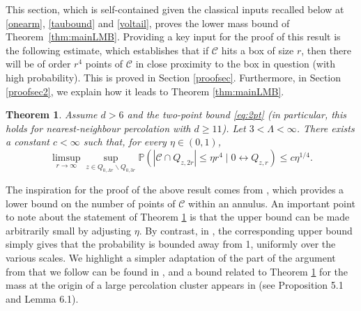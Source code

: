 \documentclass[11pt]{article}
\theoremstyle{definition}
\theoremstyle{remark}
\newcommand{\bP}{\mathbb{P}}
\numberwithin{equation}{section}
\theoremstyle{plain}
\newtheorem{thm}[theorem]{Theorem}
\theoremstyle{definition}
\theoremstyle{remark}
\theoremstyle{plain}
\begin{document}
This section, which is self-contained given the classical inputs recalled below at \eqref{onearm}, \eqref{taubound} and \eqref{voltail}, proves the lower mass bound of Theorem~\ref{thm:mainLMB}. Providing a key input for the proof of this result is the following estimate, which establishes that if $\mathcal{C}$ hits a box of size $r$, then there will be of order $r^4$ points of $\mathcal{C}$ in close proximity to the box in question (with high probability). This is proved in Section \ref{proofsec}. Furthermore, in Section \ref{proofsec2}, we explain how it leads to Theorem \ref{thm:mainLMB}.

\begin{thm}\label{thm:ulmb} Assume $d>6$ and the two-point bound \eqref{eq:2pt} (in particular, this holds for nearest-neighbour percolation with $d\ge11$). Let $3< \Lambda <\infty$. There exists a constant $c<\infty$ such that, for every $\eta\in(0,1)$,
\[\limsup_{r \rightarrow \infty}\sup_{z\in Q_{0,\Lambda r}\backslash Q_{0,3r}}\bP\left(\left|\mathcal C\cap Q_{z,2r}\right|\le \eta r^4 \mid 0 \leftrightarrow Q_{z,r}\right)\leq c\eta^{1/4}.\]
\end{thm}

The inspiration for the proof of the above result comes from \cite[Theorem 2]{KN11}, which provides a lower bound on the number of points of $\mathcal{C}$ within an annulus. An important point to note about the statement of Theorem \ref{thm:ulmb} is that the upper bound can be made arbitrarily small by adjusting $\eta$. By contrast, in \cite{KN11}, the corresponding upper bound simply gives that the probability is bounded away from 1, uniformly over the various scales. We highlight a simpler adaptation of the part of the argument from \cite{KN11} that we follow can be found in \cite{ASS}, and a bound related to Theorem \ref{thm:ulmb} for the mass at the origin of a large percolation cluster appears in \cite{HHH} (see Proposition 5.1 and Lemma 6.1).
\end{document}
